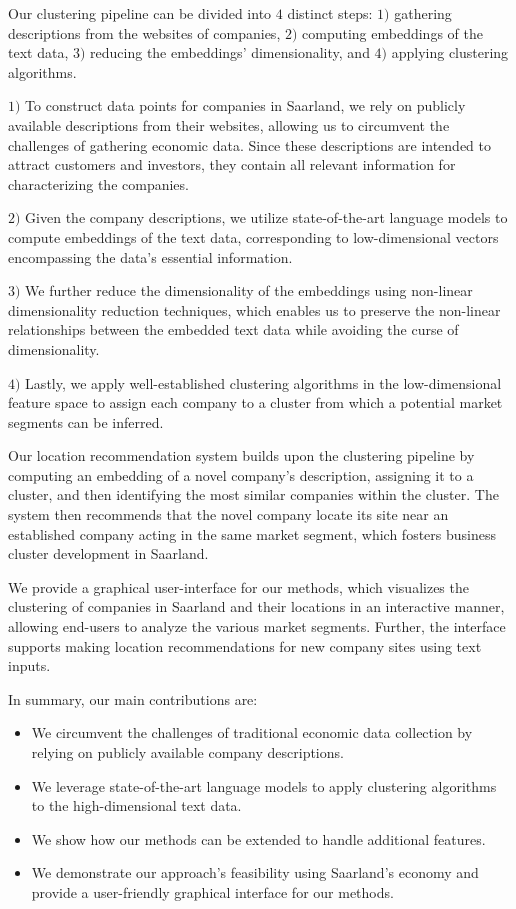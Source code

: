\documentclass[conference]{IEEEtran}
\begin{document}
Our clustering pipeline can be divided into $4$ distinct steps: $1)$ gathering descriptions from the websites of companies, $2)$ computing embeddings of the text data, $3)$ reducing the embeddings' dimensionality, and $4)$ applying clustering algorithms.

$1)$ To construct data points for companies in Saarland, we rely on publicly available descriptions from their websites, allowing us to circumvent the challenges of gathering economic data. Since these descriptions are intended to attract customers and investors, they contain all relevant information for characterizing the companies.

$2)$ Given the company descriptions, we utilize state-of-the-art language models to compute embeddings of the text data, corresponding to low-dimensional vectors encompassing the data's essential information. 

$3)$ We further reduce the dimensionality of the embeddings using non-linear dimensionality reduction techniques, which enables us to preserve the non-linear relationships between the embedded text data while avoiding the curse of dimensionality. 

$4)$ Lastly, we apply well-established clustering algorithms in the low-dimensional feature space to assign each company to a cluster from which a potential market segments can be inferred.

Our location recommendation system builds upon the clustering pipeline by computing an embedding of a novel company's description, assigning it to a cluster, and then identifying the most similar companies within the cluster. The system then recommends that the novel company locate its site near an established company acting in the same market segment, which fosters business cluster development in Saarland.

We provide a graphical user-interface for our methods, which visualizes the clustering of companies in Saarland and their locations in an interactive manner, allowing end-users to analyze the various market segments. Further, the interface supports making location recommendations for new company sites using text inputs.

In summary, our main contributions are:
\begin{itemize}
	\item We circumvent the challenges of traditional economic data collection by relying on publicly available company descriptions.
	\item We leverage state-of-the-art language models to apply clustering algorithms to the high-dimensional text data.
	\item We show how our methods can be extended to handle additional features.
	\item We demonstrate our approach's feasibility using Saarland's economy and provide a user-friendly graphical interface for our methods.
\end{itemize}
\end{document}
